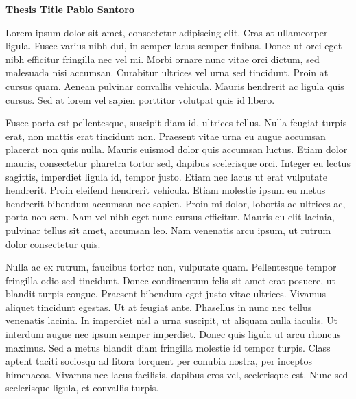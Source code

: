 \thispagestyle{plain}
\begin{center}
    \large
    \textbf{Thesis Title}
    \vspace{0.4cm}
    \textbf{Pablo Santoro}
    \vspace{Abstract}
\end{center}
Lorem ipsum dolor sit amet, consectetur adipiscing elit. Cras at ullamcorper ligula. Fusce varius nibh dui, in semper lacus semper finibus. Donec ut orci eget nibh efficitur fringilla nec vel mi. Morbi ornare nunc vitae orci dictum, sed malesuada nisi accumsan. Curabitur ultrices vel urna sed tincidunt. Proin at cursus quam. Aenean pulvinar convallis vehicula. Mauris hendrerit ac ligula quis cursus. Sed at lorem vel sapien porttitor volutpat quis id libero.

Fusce porta est pellentesque, suscipit diam id, ultrices tellus. Nulla feugiat turpis erat, non mattis erat tincidunt non. Praesent vitae urna eu augue accumsan placerat non quis nulla. Mauris euismod dolor quis accumsan luctus. Etiam dolor mauris, consectetur pharetra tortor sed, dapibus scelerisque orci. Integer eu lectus sagittis, imperdiet ligula id, tempor justo. Etiam nec lacus ut erat vulputate hendrerit. Proin eleifend hendrerit vehicula. Etiam molestie ipsum eu metus hendrerit bibendum accumsan nec sapien. Proin mi dolor, lobortis ac ultrices ac, porta non sem. Nam vel nibh eget nunc cursus efficitur. Mauris eu elit lacinia, pulvinar tellus sit amet, accumsan leo. Nam venenatis arcu ipsum, ut rutrum dolor consectetur quis.

Nulla ac ex rutrum, faucibus tortor non, vulputate quam. Pellentesque tempor fringilla odio sed tincidunt. Donec condimentum felis sit amet erat posuere, ut blandit turpis congue. Praesent bibendum eget justo vitae ultrices. Vivamus aliquet tincidunt egestas. Ut at feugiat ante. Phasellus in nunc nec tellus venenatis lacinia. In imperdiet nisl a urna suscipit, ut aliquam nulla iaculis. Ut interdum augue nec ipsum semper imperdiet. Donec quis ligula ut arcu rhoncus maximus. Sed a metus blandit diam fringilla molestie id tempor turpis. Class aptent taciti sociosqu ad litora torquent per conubia nostra, per inceptos himenaeos. Vivamus nec lacus facilisis, dapibus eros vel, scelerisque est. Nunc sed scelerisque ligula, et convallis turpis.

\newpage